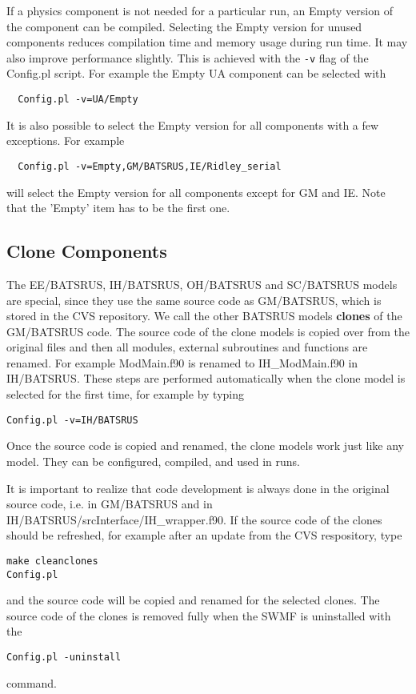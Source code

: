 If a physics component is not needed for a particular run, 
an Empty version of the component can be compiled.
Selecting the Empty version for unused components reduces
compilation time and memory usage during run time.
It may also improve performance slightly.
This is achieved with the {\tt -v} flag of the Config.pl script. 
For example the Empty UA component can be selected with
\begin{verbatim}
  Config.pl -v=UA/Empty
\end{verbatim}
It is also possible to select the Empty version for all components
with a few exceptions. For example
\begin{verbatim}
  Config.pl -v=Empty,GM/BATSRUS,IE/Ridley_serial
\end{verbatim}
will select the Empty version for all components except for GM and IE.
Note that the 'Empty' item has to be the first one.

\subsection{Clone Components}

The EE/BATSRUS, IH/BATSRUS, OH/BATSRUS and SC/BATSRUS models are special, 
since they use the same source code as GM/BATSRUS, which is stored 
in the CVS repository. We call the other BATSRUS models
{\bf clones} of the GM/BATSRUS code. The source code of the clone models
is copied over from the original files and then all modules,
external subroutines and functions are renamed. For example
ModMain.f90 is renamed to IH\_ModMain.f90 in IH/BATSRUS.
These steps are performed automatically when the clone model is selected
for the first time, for example by typing
\begin{verbatim}
Config.pl -v=IH/BATSRUS
\end{verbatim}
Once the source code is copied and renamed, the clone models work
just like any model. They can be configured, compiled, and used in runs.

It is important to realize that code development is always done
in the original source code, i.e. in GM/BATSRUS and in 
IH/BATSRUS/srcInterface/IH\_wrapper.f90.
If the source code of the clones should be refreshed, for example
after an update from the CVS respository, type
\begin{verbatim}
make cleanclones
Config.pl
\end{verbatim}
and the source code will be copied and renamed for the selected clones.
The source code of the clones is removed fully when the SWMF is
uninstalled with the
\begin{verbatim}
Config.pl -uninstall
\end{verbatim}
command. 

